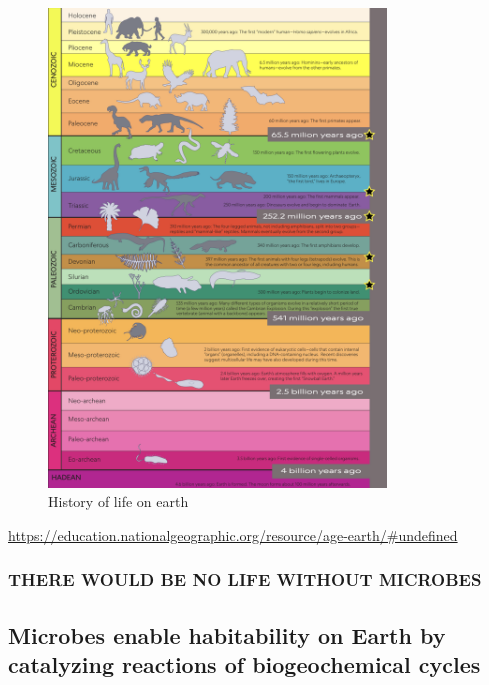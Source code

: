 \documentclass[
]{book}
\begin{document}
\begin{figure}
\centering
\includegraphics[width=0.8\textwidth,height=\textheight]{./Figures/natgeo.png}
\caption{History of life on earth}
\end{figure}

\url{https://education.nationalgeographic.org/resource/age-earth/\#undefined}

\hypertarget{there-would-be-no-life-without-microbes}{%
\subsubsection*{THERE WOULD BE NO LIFE WITHOUT MICROBES}\label{there-would-be-no-life-without-microbes}}

\hypertarget{microbes-enable-habitability-on-earth-by-catalyzing-reactions-of-biogeochemical-cycles}{%
\subsection{Microbes enable habitability on Earth by catalyzing reactions of biogeochemical cycles}\label{microbes-enable-habitability-on-earth-by-catalyzing-reactions-of-biogeochemical-cycles}}
\end{document}
